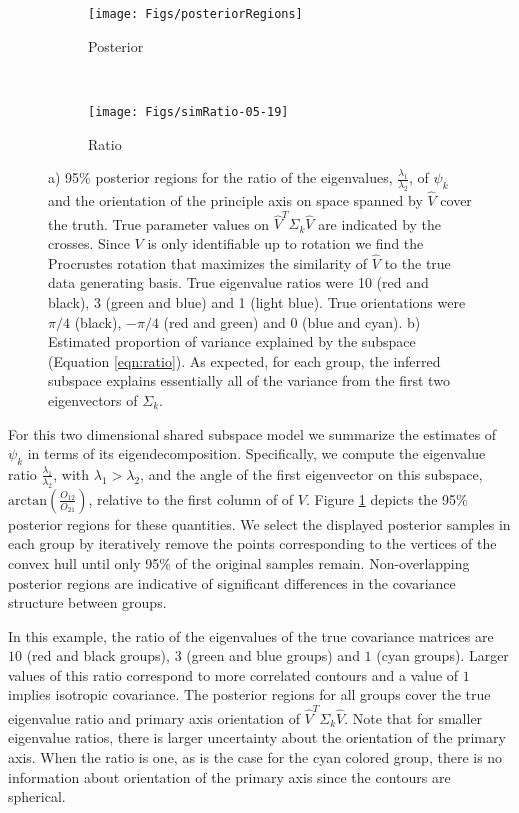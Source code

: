 \documentclass{article}
\begin{document}
\begin{figure}[t]
    \centering
    \begin{subfigure}[b]{0.45\textwidth}
    \texttt{[image: Figs/posteriorRegions]}
        \caption{Posterior}
        \label{fig:simPosterior}
    \end{subfigure}
    ~ %
    \begin{subfigure}[b]{0.4\textwidth}
        \texttt{[image: Figs/simRatio-05-19]}
        \caption{Ratio}
        \label{fig:simRatio}
    \end{subfigure}
    \caption{a) 95\% posterior regions for the ratio of the
      eigenvalues, $\frac{\lambda_1}{\lambda_2}$, of $\psi_k$ and the
      orientation of the principle axis on space spanned by $\hat{V}$
      cover the truth.  True parameter values on
      $\hat{V}^T\Sigma_k\hat{V}$ are indicated by the crosses.  Since
      $V$ is only identifiable up to rotation we find the Procrustes
      rotation that maximizes the similarity of $\hat{V}$ to the true
      data generating basis. True eigenvalue ratios were 10 (red and
      black), 3 (green and blue) and 1 (light blue).  True
      orientations were $\pi/4$ (black), $-\pi/4$ (red and green) and
      0 (blue and cyan).  b) Estimated proportion of variance
      explained by the subspace (Equation \ref{eqn:ratio}).  As
      expected, for each group, the inferred subspace explains
      essentially all of the variance from the first two eigenvectors of
      $\Sigma_k$.  }
\end{figure}

For this two dimensional shared subspace model we summarize the
estimates of $\psi_k$ in terms of its eigendecomposition.
Specifically, we compute the eigenvalue ratio
$\frac{\lambda_1}{\lambda_2}$, with $\lambda_1 > \lambda_2$, and the
angle of the first eigenvector on this subspace,
$\text{arctan}(\frac{O_{12}}{O_{21}})$, relative to the first column
of of $V$.  Figure \ref{fig:simPosterior} depicts the 95\% posterior
regions for these quantities.  We select the displayed posterior
samples in each group by iteratively remove the points corresponding
to the vertices of the convex hull until only 95\% of the original
samples remain.  Non-overlapping posterior regions are indicative of
significant differences in the covariance structure between groups.

In this example, the ratio of the eigenvalues of the true covariance
matrices are $10$ (red and black groups), $3$ (green and blue
groups) and $1$ (cyan groups).  Larger values of this ratio
correspond to more correlated contours and a value of $1$ implies
isotropic covariance.  The posterior regions for all groups cover the
true eigenvalue ratio and primary axis orientation of $\hat{V}^T\Sigma_k\hat{V}$.
Note that for smaller eigenvalue ratios, there is larger uncertainty
about the orientation of the primary axis.  When the ratio is one, as
is the case for the cyan colored group, there is no information
about orientation of the primary axis since the contours are
spherical.
\end{document}
